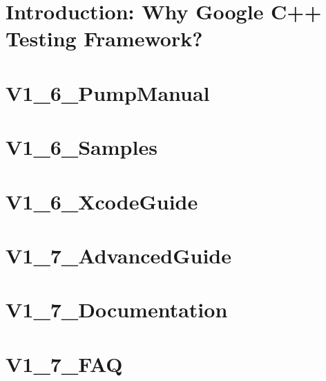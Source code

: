 \documentclass[twoside]{book}
\newcommand{\+}{\discretionary{\mbox{\scriptsize$\hookleftarrow$}}{}{}}
\begin{document}
\chapter{Introduction\+: Why Google C++ Testing Framework?}
\label{md_vendor_googletest_googletest_docs__v1_6__primer}

\chapter{V1\+\_\+6\+\_\+\+Pump\+Manual}
\label{md_vendor_googletest_googletest_docs__v1_6__pump_manual}

\chapter{V1\+\_\+6\+\_\+\+Samples}
\label{md_vendor_googletest_googletest_docs__v1_6__samples}

\chapter{V1\+\_\+6\+\_\+\+Xcode\+Guide}
\label{md_vendor_googletest_googletest_docs__v1_6__xcode_guide}

\chapter{V1\+\_\+7\+\_\+\+Advanced\+Guide}
\label{md_vendor_googletest_googletest_docs__v1_7__advanced_guide}

\chapter{V1\+\_\+7\+\_\+\+Documentation}
\label{md_vendor_googletest_googletest_docs__v1_7__documentation}

\chapter{V1\+\_\+7\+\_\+\+F\+AQ}
\label{md_vendor_googletest_googletest_docs__v1_7__f_a_q}

\end{document}
